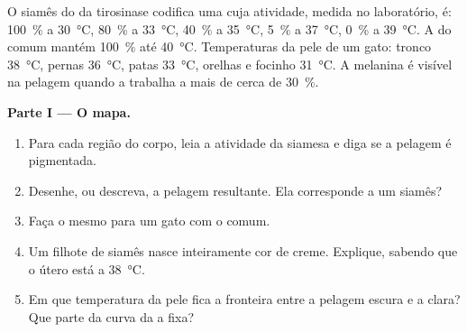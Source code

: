 \begin{problem}
\label{pb:g11:enzymes-and-phenotype:1}
O  siamês do  da tirosinase codifica uma  cuja
atividade, medida no laboratório, é: \qty{100}{\percent} a
\qty{30}{\celsius}, \qty{80}{\percent} a \qty{33}{\celsius},
\qty{40}{\percent} a \qty{35}{\celsius}, \qty{5}{\percent} a
\qty{37}{\celsius}, \qty{0}{\percent} a \qty{39}{\celsius}. A  do
 comum mantém \qty{100}{\percent} até \qty{40}{\celsius}.
Temperaturas da pele de um gato: tronco \qty{38}{\celsius}, pernas
\qty{36}{\celsius}, patas \qty{33}{\celsius}, orelhas e focinho
\qty{31}{\celsius}. A melanina é visível na pelagem quando a 
trabalha a mais de cerca de \qty{30}{\percent}.

\medskip
\noindent\textbf{Parte I --- O mapa.}
\begin{enumerate}
  \item Para cada região do corpo, leia a atividade da  siamesa e
        diga se a pelagem é pigmentada.
  \item Desenhe, ou descreva, a pelagem resultante. Ela corresponde a
        um siamês?
  \item Faça o mesmo para um gato com o  comum.
  \item Um filhote de siamês nasce inteiramente cor de creme.
        Explique, sabendo que o útero está a \qty{38}{\celsius}.
  \item Em que temperatura da pele fica a fronteira entre a pelagem
        escura e a clara? Que parte da curva da  a fixa?
\end{enumerate}


\end{problem}
